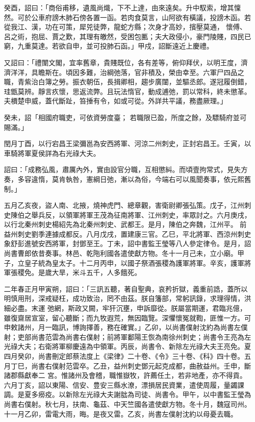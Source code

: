 \begin{pinyinscope}
 癸酉，詔曰：「商俗甫移，遺風尚熾，下不上達，由來遠矣。升中馭索，增其懍然。可於公車府謗木肺石傍各置一函。若肉食莫言，山阿欲有橫議，投謗木函。若從我江、漢，功在可策，犀兕徒弊，龍蛇方縣；次身才高妙，擯壓莫通，
 懷傅、呂之術，抱屈、賈之歎，其理有皦然，受困包匭；夫大政侵小，豪門陵賤，四民已窮，九重莫達。若欲自申，並可投肺石函。」甲戍，詔斷遠近上慶禮。



 又詔曰：「禮闈文閣，宜率舊章，貴賤既位，各有差等，俯仰拜伏，以明王度，濟濟洋洋，具瞻斯在。頃因多難，治綱弛落，官非積及，榮由幸至。六軍尸四品之職，青紫治白簿之勞。振衣朝伍，長揖卿相，趨步廣闥，並驅丞郎。遂冠履倒錯，珪甑莫辨。靜言疚懷，思返流弊。且玩法惰官，動成逋弛，罰以常科，終未懲革。夫檟楚申威，蓋代斷趾，笞捶有令，如或可從。外詳共平議，務盡厥理。」



 癸未，詔「相國府職吏，可依資勞度臺；
 若職限已盈，所度之餘，及驃騎府並可賜滿。」



 閏月丁酉，以行宕昌王梁彌邕為安西將軍、河涼二州刺史，正封宕昌王。壬寅，以車騎將軍夏侯詳為右光祿大夫。



 詔曰：「成務弘風，肅厲內外，實由設官分職，互相懲糾。而頃壹拘常式，見失方奏，多容違惰，莫肯執咎，憲綱日弛，漸以為俗，今端右可以風聞奏事，依元熙舊制。」



 五月乙亥夜，盜人南、北掖，燒神虎門、總章觀，害衛尉卿張弘策。戊子，江州刺史陳伯之舉兵反，以領軍將軍王茂為征南將軍、江州刺史，率眾討之。六月庚戌，以行北秦州刺史楊紹先為北秦州刺史、武都王。是月，陳伯之奔魏，江州平。
 前益州刺史劉季連據成都反。八月戊戌，置建康三官。乙巳，平北將軍、西涼州刺史象舒彭進號安西將軍，封鄧至王。丁未，詔中書監王瑩等八人參定律令。是月，詔尚書曹郎依昔奏事。林邑、乾陁利國各遣使獻方物。冬十一月己未，立小廟。甲子，立皇子統為皇太子。十二月丙申，以國子祭酒張稷為護軍將軍。辛亥，護軍將軍張稷免。是歲大旱，米斗五千，人多餓死。



 二年春正月甲寅朔，詔曰：「三訊五聽，著自聖典，哀矜折獄，義重前誥，蓋所以明慎用刑，深戒疑枉，成功致治，罔不由茲。朕自籓部，常躬訊錄，求理得情，洪細必盡。末運
 弛網，斯政又闕，牢犴沉壅，申訴靡從。朕屬當期運，君臨兆億，雖復齋居宣室，留心聽斷；而九牧遐荒，無因臨覽。深懼懷冤就鞫，匪惟一方。可申敕諸州，月一臨訊，博詢擇善，務在確實。」乙卯，以尚書僕射沈約為尚書左僕射；吏部尚書范雲為尚書右僕射；前將軍鄱陽王恢為南徐州刺史；尚書令王亮為左光祿大夫；右衛將軍柳慶遠為中領軍。丙辰，尚書令、新除左光祿大夫王亮免。夏四月癸卯，尚書刪定郎蔡法度上《梁律》二十卷、《令》三十卷、《科》四十卷。五月丁巳，尚書右僕射范雲卒。乙丑，益州刺史鄧元起克成都，曲赦益州。壬申，斷諸郡縣獻奉二
 宮。惟諸州及會稽，職惟嶽牧，許薦任土，若非地產，亦不得貢。六月丁亥，詔以東陽、信安、豊安三縣水潦，漂損居民資業，遣使周履，量蠲課調。是夏多癆疫。以新除左光祿大夫謝朏為司徒、尚書令。甲午，以中書監王瑩為尚書右僕射。秋七月，扶南、龜茲、中天竺國各遣使獻方物。冬十月，魏寇司州。十一月乙卯，雷電大雨，晦。是夜又雷。乙亥，尚書左僕射沈約以母憂去職。




\end{pinyinscope}
